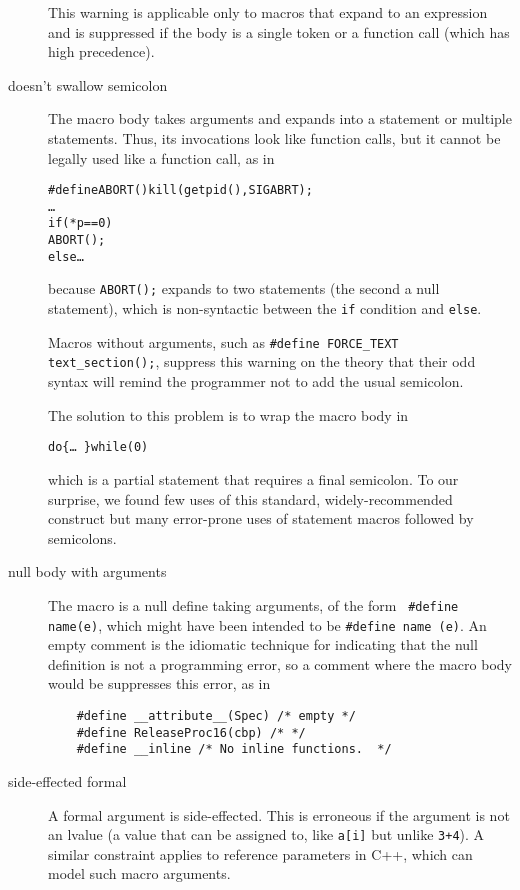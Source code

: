 \documentclass[10pt]{article}
\begin{document}
\begin{description}
        This warning is applicable only to macros that expand to an
        expression and is suppressed if the body is a single token or a
        function call (which has high precedence).

\item[doesn't swallow semicolon]\label{item:swallow-semicolon}
        The macro body takes arguments and expands into a statement or
        multiple statements.  Thus, its invocations look like function
        calls, but it cannot be legally used like a function call, as in
\begin{alltt}
    #define ABORT() kill(getpid(),SIGABRT);
    \ldots
    if (*p == 0)
      ABORT();
    else \ldots
\end{alltt}
        because {\tt ABORT();} expands to two statements (the second a null
        statement), which is non-syntactic between the {\tt if} condition and
        {\tt else}.

        Macros without arguments, such as {\tt \#define \verb|FORCE_TEXT|
        \verb|text_section|();}, suppress this warning on the theory that their
        odd syntax will remind the programmer not to add the usual semicolon.

        The solution to this problem is to wrap the macro body in
\begin{alltt}
             do \verb|{| \ldots\ \verb|}| while (0)
\end{alltt}
        which is a partial statement that requires a final semicolon.  To
        our surprise, we found few uses of this standard, widely-recommended
        construct but many error-prone uses of statement macros followed by
        semicolons.

\item[null body with arguments]
        The macro is a null define taking arguments, of the form {\tt
        \#define name(e)},
        which might have been intended to be {\tt \#define name (e)}.
        An empty comment is the idiomatic technique for indicating that the
        null definition is not a programming error, so a comment where the macro
        body would be suppresses this error, as in
\begin{verbatim}
    #define __attribute__(Spec) /* empty */
    #define ReleaseProc16(cbp) /* */
    #define __inline /* No inline functions.  */
\end{verbatim}

\item[side-effected formal]
        A formal argument is side-effected.  This is erroneous if the
        argument is not an lvalue (a value that can be assigned to, like
        {\tt a[i]} but unlike {\tt 3+4}).  A similar constraint applies to
        reference parameters in C++, which can model such macro arguments.


\end{description}
\end{document}
